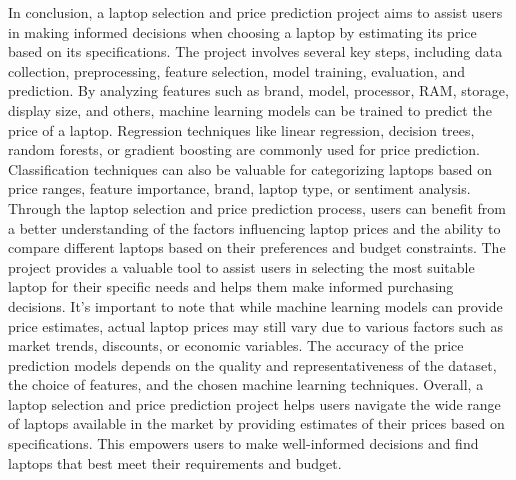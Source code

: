 
In conclusion, a laptop selection and price prediction project aims to assist users in making informed decisions when choosing a laptop by estimating its price based on its specifications. The project involves several key steps, including data collection, preprocessing, feature selection, model training, evaluation, and prediction.
By analyzing features such as brand, model, processor, RAM, storage, display size, and others, machine learning models can be trained to predict the price of a laptop. Regression techniques like linear regression, decision trees, random forests, or gradient boosting are commonly used for price prediction. Classification techniques can also be valuable for categorizing laptops based on price ranges, feature importance, brand, laptop type, or sentiment analysis.
Through the laptop selection and price prediction process, users can benefit from a better understanding of the factors influencing laptop prices and the ability to compare different laptops based on their preferences and budget constraints. The project provides a valuable tool to assist users in selecting the most suitable laptop for their specific needs and helps them make informed purchasing decisions.
It's important to note that while machine learning models can provide price estimates, actual laptop prices may still vary due to various factors such as market trends, discounts, or economic variables. The accuracy of the price prediction models depends on the quality and representativeness of the dataset, the choice of features, and the chosen machine learning techniques.
Overall, a laptop selection and price prediction project helps users navigate the wide range of laptops available in the market by providing estimates of their prices based on specifications. This empowers users to make well-informed decisions and find laptops that best meet their requirements and budget.